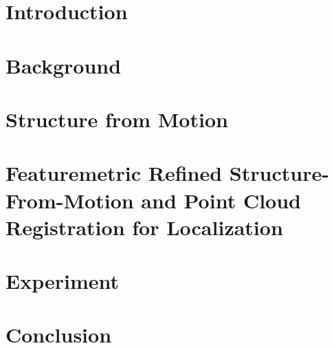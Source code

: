 \documentclass[11pt]{report}
\begin{document}
    
    \newpage

    

    \newpage
    \tableofcontents

    \newpage
    \chapter{Introduction}
    

    \newpage
    \chapter{Background}
    \label{chap:background}
    

    \newpage
    \chapter{Structure from Motion}
    \label{chap:sfm}
    

    \newpage
    \chapter{Featuremetric Refined Structure-From-Motion and Point Cloud Registration for Localization}
    \label{chap:method}
    

    \newpage
    \chapter{Experiment}
    \label{chap:experiment}
    

    \newpage
    \chapter{Conclusion}
    \label{chap:conclusion}
    

    
    
    
\end{document}

